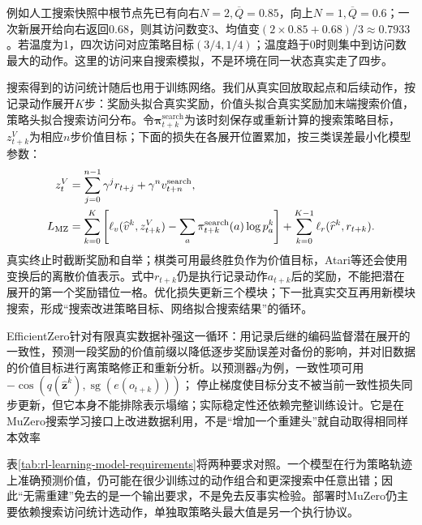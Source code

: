 例如人工搜索快照中根节点先已有向右$N=2,\overline Q=0.85$，向上$N=1,\overline Q=0.6$；一次新展开给向右返回$0.68$，则其访问数变3、均值变$(2\times0.85+0.68)/3\approx0.7933$。若温度为1，四次访问对应策略目标$(3/4,1/4)$；温度趋于0时则集中到访问数最大的动作。这里的访问来自搜索模拟，不是环境在同一状态真实走了四步。

搜索得到的访问统计随后也用于训练网络。我们从真实回放取起点和后续动作，按记录动作展开$K$步：奖励头拟合真实奖励，价值头拟合真实奖励加末端搜索价值，策略头拟合搜索访问分布。令$\bm\pi^{\mathrm{search}}_{t+k}$为该时刻保存或重新计算的搜索策略目标，$z^V_{t+k}$为相应$n$步价值目标；下面的损失在各展开位置累加，按三类误差最小化模型参数：
\begin{align}
  z^V_t&=\sum_{j=0}^{n-1}\gamma^j r_{t+j}
                     +\gamma^n v^{\mathrm{search}}_{t+n}, \notag\\
  L_{\mathrm{MZ}}
    &=\sum_{k=0}^{K}
       \left[\ell_v(\widehat v^k,z^V_{t+k})
            -\sum_a\pi^{\mathrm{search}}_{t+k}(a)\log p^k_a\right]
      +\sum_{k=0}^{K-1}\ell_r(\widehat r^k,r_{t+k}).
  \label{eq:rl-learning-muzero-loss}
\end{align}
真实终止时截断奖励和自举；棋类可用最终胜负作为价值目标，Atari等还会使用变换后的离散价值表示。式中$r_{t+k}$仍是执行记录动作$a_{t+k}$后的奖励，不能把潜在展开的第一个奖励错位一格。优化损失更新三个模块；下一批真实交互再用新模块搜索，形成“搜索改进策略目标、网络拟合搜索结果”的循环。

EfficientZero针对有限真实数据补强这一循环：用记录后继的编码监督潜在展开的一致性，预测一段奖励的价值前缀以降低逐步奖励误差对备份的影响，并对旧数据的价值目标进行离策略修正和重新分析。以预测器$q$为例，一致性项可用
$-\operatorname{cos}(q(\widehat{\bm z}^{k}),\operatorname{sg}(e(o_{t+k})))$；
停止梯度使目标分支不被当前一致性损失同步更新，但它本身不能排除表示塌缩；实际稳定性还依赖完整训练设计。它是在MuZero搜索学习接口上改进数据利用，不是“增加一个重建头”就自动取得相同样本效率

表\ref{tab:rl-learning-model-requirements}将两种要求对照。一个模型在行为策略轨迹上准确预测价值，仍可能在很少训练过的动作组合和更深搜索中任意出错；因此“无需重建”免去的是一个输出要求，不是免去反事实检验。部署时MuZero仍主要依赖搜索访问统计选动作，单独取策略头最大值是另一个执行协议。

